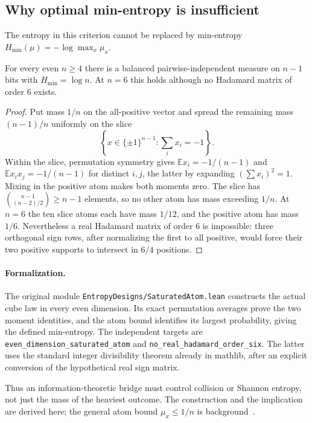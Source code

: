 \subsection{Why optimal min-entropy is insufficient}
The entropy in this criterion cannot be replaced by min-entropy
$H_{\min}(\mu)=-\log\max_x\mu_x$.
\begin{proposition}
\label{s07:prop:minentropy-counter}
For every even $n\ge4$ there is a balanced pairwise-independent measure
on $n-1$ bits with $H_{\min}=\log n$. At $n=6$ this holds although
no Hadamard matrix of order $6$ exists.
\end{proposition}
\begin{proof}
Put mass $1/n$ on the all-positive vector and spread the remaining
mass $(n-1)/n$ uniformly on the slice
\[
 \left\{x\in\{\pm1\}^{n-1}:\sum_i x_i=-1\right\}.
\]
Within the slice, permutation symmetry gives
$\mathbb E x_i=-1/(n-1)$ and
$\mathbb E x_ix_j=-1/(n-1)$ for distinct $i,j$, the latter by
expanding $(\sum x_i)^2=1$. Mixing in the positive atom makes both
moments zero. The slice has $\binom{n-1}{(n-2)/2}\ge n-1$ elements,
so no other atom has mass exceeding $1/n$.
At $n=6$ the ten slice atoms each have mass $1/12$, and the positive
atom has mass $1/6$. Nevertheless a real Hadamard matrix of order
$6$ is impossible: three orthogonal sign rows, after normalizing
the first to all positive, would force their two positive supports
to intersect in $6/4$ positions.
\end{proof}
\paragraph{Formalization.}
The original module \texttt{EntropyDesigns/\allowbreak SaturatedAtom.lean}
constructs the actual cube law in every even dimension. Its exact
permutation averages prove the two moment identities, and the atom bound
identifies its largest probability, giving the defined min-entropy.
The independent targets are
\texttt{even\_\allowbreak dimension\_\allowbreak saturated\_\allowbreak atom}
and \texttt{no\_\allowbreak real\_\allowbreak hadamard\_\allowbreak order\_\allowbreak six}.
The latter uses the standard integer divisibility theorem already in
mathlib, after an explicit conversion of the hypothetical real sign matrix.

Thus an information-theoretic bridge must control collision or Shannon
entropy, not just the mass of the heaviest outcome. The construction
and the implication are derived here; the general atom bound
$\mu_x\le1/n$ is background~\cite{s06:GP}.

